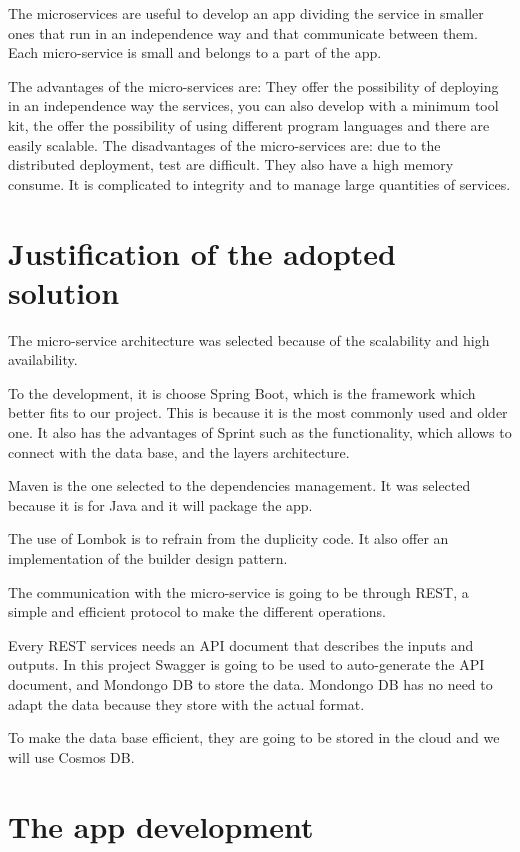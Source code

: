 \documentclass[12pt]{report} %
\begin{document}
The microservices are useful to develop an app dividing the service in smaller ones that run in an independence way and that communicate between them. Each micro-service is small and belongs to a part of the app.

The advantages of the micro-services are: They offer the possibility of deploying in an independence way the services, you can also develop with a minimum tool kit, the offer the possibility of using different program languages and there are easily scalable. The disadvantages of the micro-services are: due to the distributed deployment, test are difficult. They also have a high memory consume. It is complicated to integrity and to manage large quantities of services. 



\section{Justification of the adopted solution}

The micro-service architecture was selected because of the scalability and high availability.

To the development, it is choose Spring Boot, which is the framework which better fits to our project. This is because it is the most commonly used and older one. It also has the advantages of Sprint such as the functionality, which allows to connect with the data base, and the layers architecture.

Maven is the one selected to the dependencies management. It was selected because it is for Java and it will package the app.

The use of Lombok is to refrain from the duplicity code. It also offer an implementation of the builder design pattern.

The communication with the micro-service is going to be through REST, a simple and efficient protocol to make the different operations.

Every REST services needs an API document that describes the inputs and outputs. In this project Swagger is going to be used to auto-generate the API document, and Mondongo DB to store the data. Mondongo DB has no need to adapt the data because they store with the actual format.

To make the data base efficient, they are going to be stored in the cloud and we will use Cosmos DB.

\section{The app development}
\end{document}
